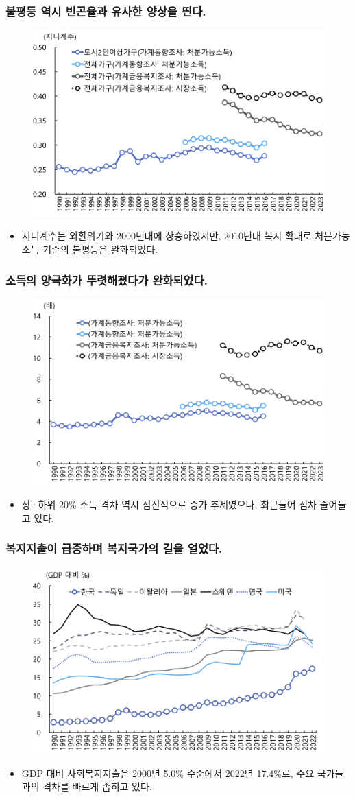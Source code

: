 \documentclass[aspectratio=169,xcolor=dvipsnames,handout]{beamer}
\begin{document}
\begin{frame}[<+->]
\frametitle{불평등 역시 빈곤율과 유사한 양상을 띈다.}
    \begin{figure}
        \centering
        \includegraphics[width=.5\textwidth]{pic/fig_ineq_08.png}
    \end{figure}
    \begin{itemize}
        \item 지니계수는 외환위기와 2000년대에 상승하였지만, 2010년대 복지 확대로 처분가능소득 기준의 불평등은 완화되었다.
    \end{itemize}
\end{frame}

\begin{frame}[<+->]
\frametitle{소득의 양극화가 뚜렷해졌다가 완화되었다.}
    \begin{figure}
        \centering
        \includegraphics[width=.5\textwidth]{pic/fig_ineq_09.png}
    \end{figure}
    \begin{itemize}
        \item 상·하위 20\% 소득 격차 역시 점진적으로 증가 추세였으나, 최근들어 점차 줄어들고 있다.
    \end{itemize}
\end{frame}

\begin{frame}[<+->]
\frametitle{복지지출이 급증하며 복지국가의 길을 열었다.}
    \begin{figure}
        \centering
        \includegraphics[width=.5\textwidth]{pic/fig_ineq_10.png}
    \end{figure}
    \begin{itemize}
        \item GDP 대비 사회복지지출은 2000년 5.0\% 수준에서 2022년 17.4\%로, 주요 국가들과의 격차를 빠르게 좁히고 있다.
    \end{itemize}
\end{frame}
\end{document}
